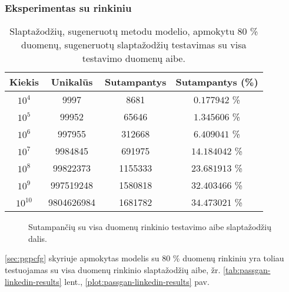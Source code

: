\documentclass{VUMIFInfBakalaurinis}
\begin{document}
\subsubsection{Eksperimentas su  rinkiniu} %
\begin{table}[ht]
  \centering
  \caption{
    Slaptažodžių, sugeneruotų  metodu modelio, apmokytu 80 \% 
     duomenų, sugeneruotų slaptažodžių testavimas su visa
     testavimo duomenų aibe.
  }
  \begin{tabular}{|c|c|c|c|}
    \hline \textbf{Kiekis} & \textbf{Unikalūs} & \textbf{Sutampantys} & 
    \textbf{Sutampantys (\%)} \\
    \hline $10^4$ & 9997 & 8681 & $0.177942$ \% \\
    \hline $10^5$ & 99952 & 65646 & $1.345606$ \% \\
    \hline $10^6$ & 997955 & 312668 & $6.409041$ \% \\
    \hline $10^7$ & 9984845 & 691975 & $14.184042$ \% \\
    \hline $10^8$ & 99822373 & 1155333 & $23.681913$ \% \\
    \hline $10^9$ & 997519248 & 1580818 & $32.403466$ \% \\ 
    \hline $10^{10}$ & 9804626984 & 1681782 & $34.473021$ \% \\
    \hline
  \end{tabular}
  \label{tab:pcfg-linkedin-results}
\end{table}

\begin{figure}[ht]
  \begin{center}
  \end{center}
  \caption{
    Sutampančių su visa  duomenų rinkinio testavimo aibe 
    slaptažodžių dalis.
  }
  \label{plot:pcfg-linkedin-results}
\end{figure}
\ref{sec:pgpcfg} skyriuje apmokytas modelis su 80 \%  duomenų 
rinkiniu yra toliau testuojamas su visa  duomenų rinkinio 
slaptažodžių aibe, žr. \ref{tab:passgan-linkedin-results} lent., 
\ref{plot:passgan-linkedin-results} pav.
\end{document}
